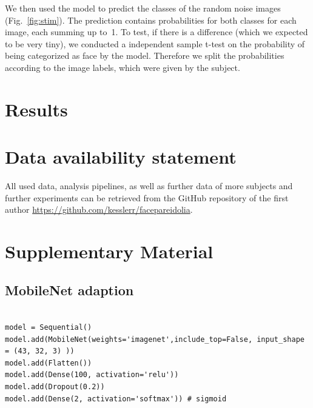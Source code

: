 \documentclass[10pt,a4paper,twocolumn]{article}
\begin{document}
We then used the model to predict the classes of the random noise images (Fig.~\ref{fig:stim}). The prediction contains probabilities for both classes for each image, each summing up to~1. To test, if there is a difference (which we expected to be very tiny), we conducted a independent sample t-test on the probability of being categorized as face by the model. Therefore we split the probabilities according to the image labels, which were given by the subject.

\section{Results}




\section*{Data availability statement}

All used data, analysis pipelines, as well as further data of more subjects and further experiments can be retrieved from the GitHub repository of the first author \url{https://github.com/kesslerr/facepareidolia}.





\section*{Supplementary Material}
\subsection*{MobileNet adaption}

\begin{verbatim}

model = Sequential()
model.add(MobileNet(weights='imagenet',include_top=False, input_shape = (43, 32, 3) )) 
model.add(Flatten())
model.add(Dense(100, activation='relu'))
model.add(Dropout(0.2))
model.add(Dense(2, activation='softmax')) # sigmoid

\end{verbatim}

\subsection*{}
\end{document}
